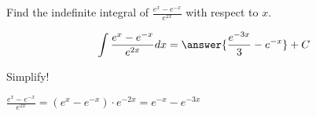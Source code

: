 \documentclass{ximera}
\author{Gregory Hartman \and Matthew Carr}
\begin{document}
\begin{exercise}

Find the indefinite integral of $\frac{e^x-e^{-x}}{e^{2x}}$ with respect to $x$.

\[
\int \frac{e^x-e^{-x}}{e^{2x}} dx=\answer{\frac{e^{-3 x}}{3}-e^{-x}}+C
\]
\begin{hint}
Simplify!
\end{hint}
\begin{hint}
$\frac{e^x-e^{-x}}{e^{2x}}=(e^x-e^{-x})\cdot e^{-2x}=e^{-x}-e^{-3x}$
\end{hint}
\end{exercise}
\end{document}
